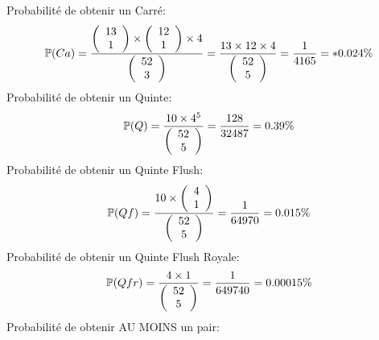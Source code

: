 Probabilité de obtenir un Carré:\\
\begin{equation*}
    \mathbb{P}(Ca) = \frac{{\left( \begin{array}{cc}13 \\ 1\end{array} \right)} \times {\left( \begin{array}{cc}12 \\ 1\end{array} \right)} \times 4}{{\left( \begin{array}{cc}52 \\ 3\end{array} \right)}} = \frac{13 \times 12 \times 4}{{\left( \begin{array}{cc}52 \\ 5\end{array} \right)}} = \frac{1}{4165} =* 0.024\%
\end{equation*}
Probabilité de obtenir un Quinte:\\
\begin{equation*}
    \mathbb{P}(Q) = \frac{10\times4^5}{{\left( \begin{array}{cc}52 \\ 5\end{array} \right)}} = \frac{128}{32487} = 0.39\%
\end{equation*}
Probabilité de obtenir un Quinte Flush:\\
\begin{equation*}
    \mathbb{P}(Qf) = \frac{10 \times {\left( \begin{array}{cc}4 \\ 1\end{array} \right)}}{{\left( \begin{array}{cc}52 \\ 5\end{array} \right)}} = \frac{1}{64970} = 0.015\%
\end{equation*}
Probabilité de obtenir un Quinte Flush Royale:\\
\begin{equation*}
    \mathbb{P}(Qfr) = \frac{4 \times 1}{{\left( \begin{array}{cc}52 \\ 5\end{array} \right)}} = \frac{1}{649740} = 0.00015\%
\end{equation*}
Probabilité de obtenir AU MOINS un pair:\\
